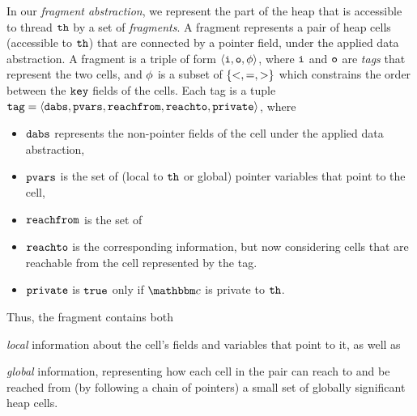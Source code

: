 In our {\em fragment abstraction}, we represent the part of the heap
that is accessible to thread ${\tt th}$ by a set of {\em fragments}. 
A fragment represents a pair of heap cells (accessible to ${\tt th}$)
that are connected by a pointer field, under the applied data abstraction.
A fragment is a  triple of form $\left\langle\mathtt{i},\mathtt{o},\phi\right\rangle$,
where $\mathtt{i}$ and $\mathtt{o}$ are {\em tags} that represent the two cells, and $\phi$
is a subset of $\left\{<, =, >\right\}$ which constrains the order between the $\tt key$
fields of the cells. Each tag is a tuple $\mathtt{tag} = \left\langle\mathtt{dabs},\mathtt{pvars},\mathtt{reachfrom},\mathtt{reachto},\mathtt{private}\right\rangle$, where
\begin{itemize}
\item
  $\mathtt{dabs}$ represents the non-pointer fields of the cell under the applied
  data abstraction,
\item
  $\mathtt{pvars}$ is the set of (local to ${\tt th}$ or global) pointer variables that
  point to the cell,
 \item
  $\mathtt{reachfrom}$ is the set of
\item
  $\mathtt{reachto}$ is the corresponding information, but now considering cells that
  are reachable from the cell represented by the tag.
  \item $\mathtt{private}$ is ${\tt true}$ only if $\cell$ is private to ${\tt th}$.
\end{itemize}
Thus, the fragment contains both
\begin{inparaenum}[(i)]
\item {\em local} information about the cell's fields and variables that
  point to it, as well as
\item {\em global} information, representing how
  each cell in the pair can reach to and be reached from
  (by following a chain of pointers) a small set of globally significant
  heap cells.
\end{inparaenum}

